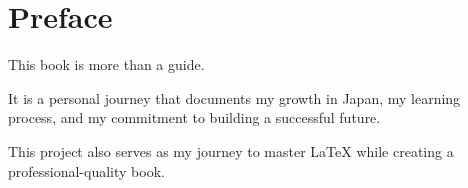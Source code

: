 \chapter*{Preface}

This book is more than a guide.

It is a personal journey that documents my growth in Japan, my learning process, and my commitment to building a successful future.

This project also serves as my journey to master LaTeX while creating a professional-quality book.

\clearpage
